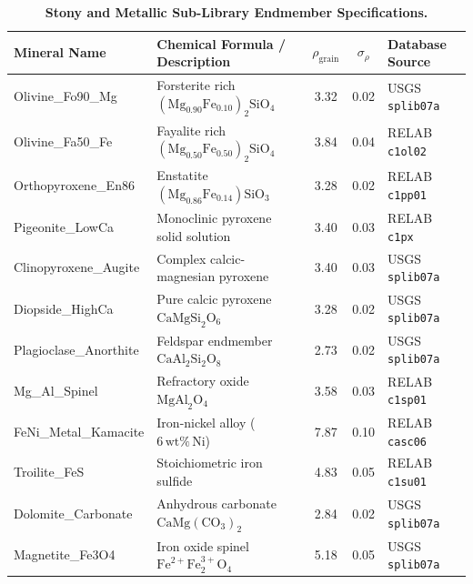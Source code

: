 \documentclass[11pt,a4paper]{article}
\begin{document}
\begin{table}[H]
\centering
\caption{\textbf{Stony and Metallic Sub-Library Endmember Specifications.}}
\label{tab:stony_library}
\small
\begin{tabularx}{\textwidth}{p{} p{} c c p{}}
\toprule
Mineral Name & Chemical Formula / Description & $\rho_{\text{grain}}$ & $\sigma_{\rho}$ & Database Source \\
\midrule
Olivine\_Fo90\_Mg & Forsterite rich $(\text{Mg}_{0.90}\text{Fe}_{0.10})_2\text{SiO}_4$ & 3.32\cite{Consolmagno2008} & 0.02\cite{Consolmagno2008} & USGS \texttt{splib07a}\cite{Clark2007} \\
Olivine\_Fa50\_Fe & Fayalite rich $(\text{Mg}_{0.50}\text{Fe}_{0.50})_2\text{SiO}_4$ & 3.84\cite{Consolmagno2008} & 0.04\cite{Consolmagno2008} & RELAB \texttt{c1ol02}\cite{Pieters2004} \\
Orthopyroxene\_En86 & Enstatite $(\text{Mg}_{0.86}\text{Fe}_{0.14})\text{SiO}_3$ & 3.28\cite{Consolmagno2008} & 0.02\cite{Consolmagno2008} & RELAB \texttt{c1pp01}\cite{Pieters2004} \\
Pigeonite\_LowCa & Monoclinic pyroxene solid solution & 3.40\cite{Consolmagno2008} & 0.03\cite{Consolmagno2008} & RELAB \texttt{c1px}\cite{Pieters2004} \\
Clinopyroxene\_Augite & Complex calcic-magnesian pyroxene & 3.40\cite{Consolmagno2008} & 0.03\cite{Consolmagno2008} & USGS \texttt{splib07a}\cite{Clark2007} \\
Diopside\_HighCa & Pure calcic pyroxene $\text{CaMgSi}_2\text{O}_6$ & 3.28\cite{Deer2013} & 0.02\cite{Deer2013} & USGS \texttt{splib07a}\cite{Clark2007} \\
Plagioclase\_Anorthite & Feldspar endmember $\text{CaAl}_2\text{Si}_2\text{O}_8$ & 2.73\cite{Deer2013} & 0.02\cite{Deer2013} & USGS \texttt{splib07a}\cite{Clark2007} \\
Mg\_Al\_Spinel & Refractory oxide $\text{MgAl}_2\text{O}_4$ & 3.58\cite{Deer2013} & 0.03\cite{Deer2013} & RELAB \texttt{c1sp01}\cite{Pieters2004} \\
FeNi\_Metal\_Kamacite & Iron-nickel alloy ($6\,\text{wt}\%\,\text{Ni}$) & 7.87\cite{Buchwald1975} & 0.10\cite{Buchwald1975} & RELAB \texttt{casc06}\cite{Pieters2004} \\
Troilite\_FeS & Stoichiometric iron sulfide & 4.83\cite{Britt2003} & 0.05\cite{Britt2003} & RELAB \texttt{c1su01}\cite{Pieters2004} \\
Dolomite\_Carbonate & Anhydrous carbonate $\text{CaMg}(\text{CO}_3)_2$ & 2.84\cite{Althoff1977} & 0.02\cite{Althoff1977} & USGS \texttt{splib07a}\cite{Clark2007} \\
Magnetite\_Fe3O4 & Iron oxide spinel $\text{Fe}^{2+}\text{Fe}^{3+}_2\text{O}_4$ & 5.18\cite{Macke2011} & 0.05\cite{Macke2011} & USGS \texttt{splib07a}\cite{Clark2007} \\
\bottomrule
\end{tabularx}
\end{table}
\end{document}
